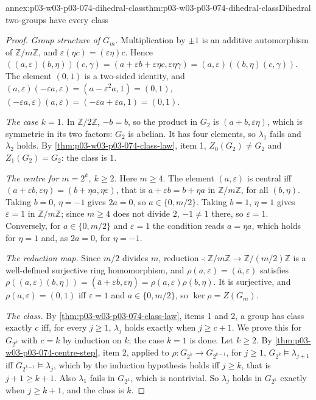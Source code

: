 \begin{annexitem}{annex:p03-w03-p03-074-dihedral-class}{thm:p03-w03-p03-074-dihedral-class}{Dihedral two-groups have every class}
\begin{proof}
\emph{Group structure of \(G_m\).} Multiplication by \(\pm1\) is an
additive automorphism of \(\mathbb Z/m\mathbb Z\), and
\(\varepsilon(\eta c)=(\varepsilon\eta)c\). Hence
\(((a,\varepsilon)(b,\eta))(c,\gamma)=(a+\varepsilon b+\varepsilon\eta c,
\varepsilon\eta\gamma)=(a,\varepsilon)((b,\eta)(c,\gamma))\). The element
\((0,1)\) is a two-sided identity, and
\((a,\varepsilon)(-\varepsilon a,\varepsilon)=(a-\varepsilon^2a,1)=(0,1)\),
\((-\varepsilon a,\varepsilon)(a,\varepsilon)=(-\varepsilon a+\varepsilon
a,1)=(0,1)\).

\emph{The case \(k=1\).} In \(\mathbb Z/2\mathbb Z\), \(-b=b\), so the
product in \(G_2\) is \((a+b,\varepsilon\eta)\), which is symmetric in its
two factors: \(G_2\) is abelian. It has four elements, so \(\lambda_1\)
fails and \(\lambda_2\) holds. By
\cref{thm:p03-w03-p03-074-class-law}, item 1, \(Z_0(G_2)\neq G_2\) and
\(Z_1(G_2)=G_2\): the class is \(1\).

\emph{The centre for \(m=2^k\), \(k\ge2\).} Here \(m\ge4\). The element
\((a,\varepsilon)\) is central iff
\((a+\varepsilon b,\varepsilon\eta)=(b+\eta a,\eta\varepsilon)\), that is
\(a+\varepsilon b=b+\eta a\) in \(\mathbb Z/m\mathbb Z\), for all
\((b,\eta)\). Taking \(b=0\), \(\eta=-1\) gives \(2a=0\), so
\(a\in\{0,m/2\}\). Taking \(b=1\), \(\eta=1\) gives \(\varepsilon=1\) in
\(\mathbb Z/m\mathbb Z\); since \(m\ge4\) does not divide \(2\),
\(-1\neq1\) there, so \(\varepsilon=1\). Conversely, for
\(a\in\{0,m/2\}\) and \(\varepsilon=1\) the condition reads \(a=\eta a\),
which holds for \(\eta=1\) and, as \(2a=0\), for \(\eta=-1\).

\emph{The reduction map.} Since \(m/2\) divides \(m\), reduction
\(\bar{\ }:\mathbb Z/m\mathbb Z\to\mathbb Z/(m/2)\mathbb Z\) is a
well-defined surjective ring homomorphism, and
\(\rho(a,\varepsilon)=(\bar a,\varepsilon)\) satisfies
\(\rho((a,\varepsilon)(b,\eta))=(\bar a+\varepsilon\bar b,\varepsilon\eta)
=\rho(a,\varepsilon)\rho(b,\eta)\). It is surjective, and
\(\rho(a,\varepsilon)=(0,1)\) iff \(\varepsilon=1\) and
\(a\in\{0,m/2\}\), so \(\ker\rho=Z(G_m)\).

\emph{The class.} By \cref{thm:p03-w03-p03-074-class-law}, items 1 and 2,
a group has class exactly \(c\) iff, for every \(j\ge1\),
\(\lambda_j\) holds exactly when \(j\ge c+1\). We prove this for
\(G_{2^k}\) with \(c=k\) by induction on \(k\); the case \(k=1\) is
done. Let \(k\ge2\). By \cref{thm:p03-w03-p03-074-centre-step}, item 2,
applied to \(\rho:G_{2^k}\to G_{2^{k-1}}\), for \(j\ge1\),
\(G_{2^k}\models\lambda_{j+1}\) iff \(G_{2^{k-1}}\models\lambda_j\), which
by the induction hypothesis holds iff \(j\ge k\), that is
\(j+1\ge k+1\). Also \(\lambda_1\) fails in \(G_{2^k}\), which is
nontrivial. So \(\lambda_j\) holds in \(G_{2^k}\) exactly when
\(j\ge k+1\), and the class is \(k\).
\end{proof}
\end{annexitem}

